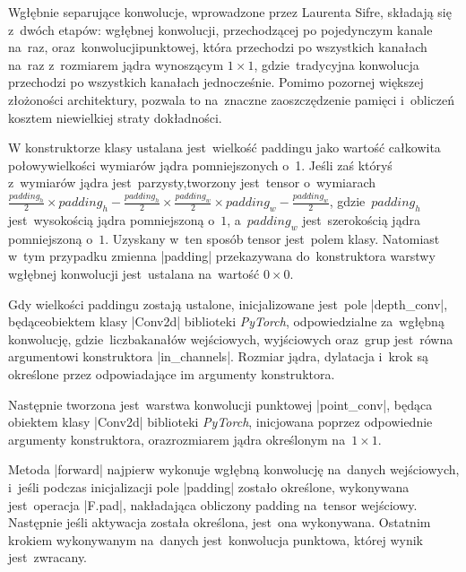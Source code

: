 Wgłębnie separujące konwolucje, wprowadzone przez Laurenta Sifre\cite{Sifre2014}, składają się z~dwóch etapów: wgłębnej konwolucji, przechodzącej po pojedynczym kanale na~raz, oraz~konwolucji\linebreak punktowej, która przechodzi po wszystkich kanałach na~raz z~rozmiarem jądra wynoszącym $1 \times 1$, gdzie~tradycyjna konwolucja przechodzi po wszystkich kanałach jednocześnie. Pomimo pozornej większej złożoności architektury, pozwala to na~znaczne zaoszczędzenie pamięci i~obliczeń kosztem niewielkiej straty dokładności.

W konstruktorze klasy ustalana jest~wielkość paddingu jako wartość całkowita połowy\linebreak wielkości wymiarów jądra pomniejszonych o~1. Jeśli zaś któryś z~wymiarów jądra jest~parzysty,\linebreak tworzony jest~tensor o~wymiarach $\frac{padding_h}{2} \times padding_h - \frac{padding_h}{2} \times \frac{padding_w}{2} \times padding_w - \frac{padding_w}{2}$, gdzie~$padding_h$ jest~wysokością jądra pomniejszoną o~$1$, a~$padding_w$ jest~szerokością jądra pomniejszoną o~$1$. Uzyskany w~ten sposób tensor jest~polem klasy. Natomiast w~tym przypadku zmienna \pyth|padding| przekazywana do~konstruktora warstwy wgłębnej konwolucji jest~ustalana na~wartość $0 \times 0$.

Gdy wielkości paddingu zostają ustalone, inicjalizowane jest~pole \pyth|depth_conv|, będące\linebreak obiektem klasy \pyth|Conv2d| biblioteki \textit{PyTorch}, odpowiedzialne za~wgłębną konwolucję, gdzie~liczba\linebreak kanałów wejściowych, wyjściowych oraz~grup jest~równa argumentowi konstruktora \pyth|in_channels|. Rozmiar jądra, dylatacja i~krok są określone przez odpowiadające im argumenty konstruktora.

Następnie tworzona jest~warstwa konwolucji punktowej \pyth|point_conv|, będąca obiektem klasy \pyth|Conv2d| biblioteki \textit{PyTorch}, inicjowana poprzez odpowiednie argumenty konstruktora, oraz\linebreak rozmiarem jądra określonym na~$1 \times 1$.

Metoda \pyth|forward| najpierw wykonuje wgłębną konwolucję na~danych wejściowych, i~jeśli podczas inicjalizacji pole \pyth|padding| zostało określone, wykonywana jest~operacja \pyth|F.pad|, nakładająca obliczony padding na~tensor wejściowy. Następnie jeśli aktywacja została określona, jest~ona wykonywana. Ostatnim krokiem wykonywanym na~danych jest~konwolucja punktowa, której wynik jest~zwracany.

